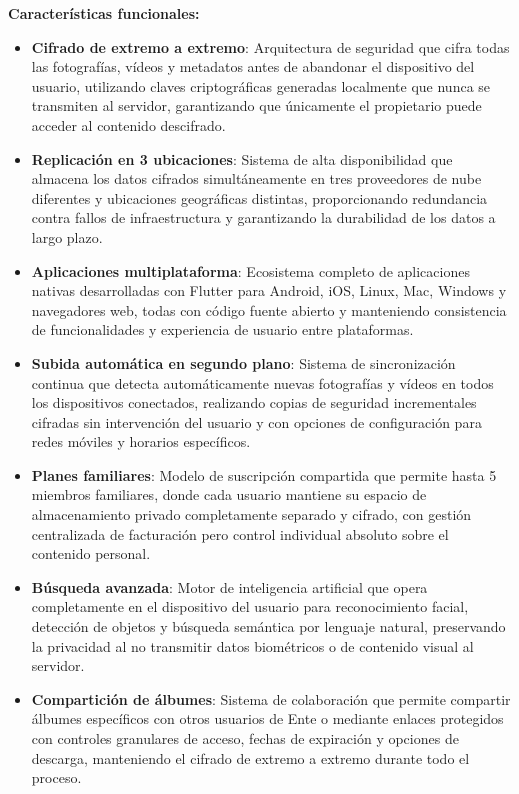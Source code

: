 \textbf{Características funcionales:}
\begin{itemize}
    \item \textbf{Cifrado de extremo a extremo}: Arquitectura de seguridad que cifra todas las fotografías, vídeos y metadatos antes de abandonar el dispositivo del usuario, utilizando claves criptográficas generadas localmente que nunca se transmiten al servidor, garantizando que únicamente el propietario puede acceder al contenido descifrado.
    \item \textbf{Replicación en 3 ubicaciones}: Sistema de alta disponibilidad que almacena los datos cifrados simultáneamente en tres proveedores de nube diferentes y ubicaciones geográficas distintas, proporcionando redundancia contra fallos de infraestructura y garantizando la durabilidad de los datos a largo plazo.
    \item \textbf{Aplicaciones multiplataforma}: Ecosistema completo de aplicaciones nativas desarrolladas con Flutter para Android, iOS, Linux, Mac, Windows y navegadores web, todas con código fuente abierto y manteniendo consistencia de funcionalidades y experiencia de usuario entre plataformas.
    \item \textbf{Subida automática en segundo plano}: Sistema de sincronización continua que detecta automáticamente nuevas fotografías y vídeos en todos los dispositivos conectados, realizando copias de seguridad incrementales cifradas sin intervención del usuario y con opciones de configuración para redes móviles y horarios específicos.
    \item \textbf{Planes familiares}: Modelo de suscripción compartida que permite hasta 5 miembros familiares, donde cada usuario mantiene su espacio de almacenamiento privado completamente separado y cifrado, con gestión centralizada de facturación pero control individual absoluto sobre el contenido personal.
    \item \textbf{Búsqueda avanzada}: Motor de inteligencia artificial que opera completamente en el dispositivo del usuario para reconocimiento facial, detección de objetos y búsqueda semántica por lenguaje natural, preservando la privacidad al no transmitir datos biométricos o de contenido visual al servidor.
    \item \textbf{Compartición de álbumes}: Sistema de colaboración que permite compartir álbumes específicos con otros usuarios de Ente o mediante enlaces protegidos con controles granulares de acceso, fechas de expiración y opciones de descarga, manteniendo el cifrado de extremo a extremo durante todo el proceso.

\end{itemize}
